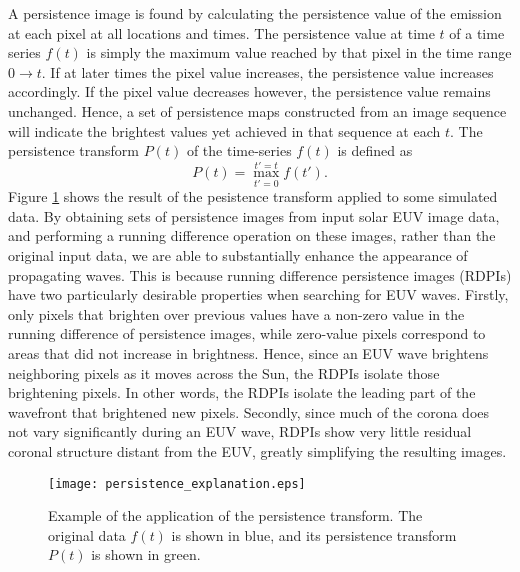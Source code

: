 A persistence image is found by calculating the persistence value of
the emission at each pixel at all locations and times.  The
persistence value at time $t$ of a time series $f(t)$ is simply the
maximum value reached by that pixel in the time range $0\rightarrow
t$.  If at later times the pixel value increases, the persistence
value increases accordingly. If the pixel value decreases however, the
persistence value remains unchanged. Hence, a set of persistence maps
constructed from an image sequence will indicate the brightest values
yet achieved in that sequence at each $t$.  The persistence transform
$P(t)$ of the time-series $f(t)$ is defined as
\begin{equation}
\label{eqn:persisttransform}
P(t) = \max_{t'=0}^{t'=t}f(t').
\end{equation}
Figure \ref{fig:persistence} shows the result of the pesistence
transform applied to some simulated data.  By obtaining sets of
persistence images from input solar EUV image data, and performing a
running difference operation on these images, rather than the original
input data, we are able to substantially enhance the appearance of
propagating waves. This is because running difference persistence
images (RDPIs) have two particularly desirable properties when
searching for EUV waves.  Firstly, only pixels that brighten over
previous values have a non-zero value in the running difference of
persistence images, while zero-value pixels correspond to areas that
did not increase in brightness. Hence, since an EUV wave brightens
neighboring pixels as it moves across the Sun, the RDPIs isolate those
brightening pixels.  In other words, the RDPIs isolate the leading
part of the wavefront that brightened new pixels.  Secondly, since
much of the corona does not vary significantly during an EUV wave,
RDPIs show very little residual coronal structure distant from the
EUV, greatly simplifying the resulting images.

\begin{figure}
\begin{center}
\texttt{[image: persistence\_explanation.eps]}
\caption{Example of the application of the persistence transform.  The
original data $f(t)$ is shown in blue, and its persistence transform
$P(t)$ is shown in green.}
\label{fig:persistence}
\end{center}
\end{figure}

